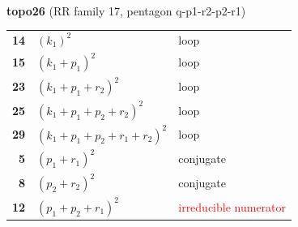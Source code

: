 \documentclass[10pt]{article}
\begin{document}
\begin{minipage}[t]{0.48\textwidth}
{}\\[2mm]\textbf{topo26} (RR family 17, pentagon q-p1-r2-p2-r1)\\[2pt]{\footnotesize\begin{tabular}{@{}r@{\ \ }l@{\ \ }l@{}}\textbf{14} & $(k_1)^2$ & loop\\
\textbf{15} & $(k_1+p_1)^2$ & loop\\
\textbf{23} & $(k_1+p_1+r_2)^2$ & loop\\
\textbf{25} & $(k_1+p_1+p_2+r_2)^2$ & loop\\
\textbf{29} & $(k_1+p_1+p_2+r_1+r_2)^2$ & loop\\
\textbf{5} & $(p_1+r_1)^2$ & conjugate\\
\textbf{8} & $(p_2+r_2)^2$ & conjugate\\
\textbf{12} & $(p_1+p_2+r_1)^2$ & \textcolor{red}{irreducible numerator}\\\end{tabular}}\end{minipage}

\bigskip
\end{document}
